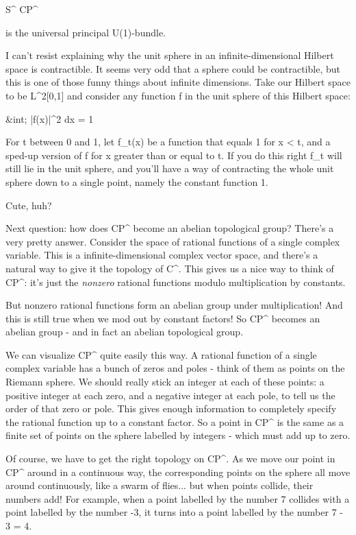 S^{\infty } \to  CP^{\infty }

is the universal principal U(1)-bundle.

I can't resist explaining why the unit sphere in an infinite-dimensional
Hilbert space is contractible.  It seems very odd that a sphere could be
contractible, but this is one of those funny things about infinite
dimensions.  Take our Hilbert space to be L^{2}[0,1] and consider any 
function f in the unit sphere of this Hilbert space:

&int; |f(x)|^{2} dx = 1

For t between 0 and 1, let f_{t}(x) 
be a function that equals 1 for x < t,
and a sped-up version of f for x greater than or equal to t.  If you do
this right f_{t} 
will still lie in the unit sphere, and you'll have a way
of contracting the whole unit sphere down to a single point, namely the
constant function 1.  

Cute, huh?

Next question: how does CP^{\infty } become an abelian topological group?
There's a very pretty answer.  Consider the space of rational functions
of a single complex variable.  This is a infinite-dimensional complex
vector space, and there's a natural way to give it the topology of
C^{\infty }.   This gives us a nice way to think of CP^{\infty }: it's
just the \emph{nonzero} rational functions modulo multiplication by constants.  

But nonzero rational functions form an abelian group under multiplication!
And this is still true when we mod out by constant factors!  So CP^{\infty } 
becomes an abelian group - and in fact an abelian topological group.

We can visualize CP^{\infty } quite easily this way.  A
rational function of a single complex variable has a bunch of zeros and
poles - think of them as points on the Riemann sphere.  We should really 
stick an integer at each of these points: a positive integer at each zero,
and a negative integer at each pole, to tell us the order of that zero
or pole.  This gives enough information to completely specify the
rational function up to a constant factor.  So a point in
CP^{\infty } is the same as a finite set of points on the
sphere labelled by integers - which must add up to zero.

Of course, we have to get the right topology on CP^{\infty }.  
As we move our point in CP^{\infty } around in a continuous way, 
the corresponding points on the sphere all move around continuously, 
like a swarm of flies... but when points collide, their numbers add!
For example, when a point labelled by the number 7 collides with a 
point labelled by the number -3, it turns into a point labelled by 
the number 7 - 3 = 4.   

